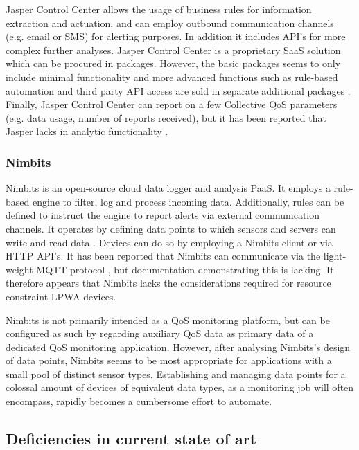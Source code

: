 Jasper Control Center allows the usage of business rules for information extraction and actuation, and can employ outbound communication channels (e.g. email or SMS) for alerting purposes.  In addition it includes API's for more complex further analyses. Jasper Control Center is a proprietary SaaS solution which can be procured in packages. However, the basic packages seems to only include minimal functionality and more advanced functions such as rule-based automation and third party API access are sold in separate additional packages \cite{cisco_jasper}. Finally, Jasper Control Center can report on a few Collective QoS parameters (e.g. data usage, number of reports received), but it has been reported that Jasper lacks in analytic functionality \cite{forrester}.

\subsubsection*{Nimbits}
Nimbits \cite{web:nimbits} is an open-source cloud data logger and analysis PaaS. It employs a rule-based engine to filter, log and process incoming data. Additionally, rules can be defined to instruct the engine to report alerts via external communication channels. It operates by defining data points to which sensors and servers can write and read data \cite{study_of_various, nimbits_mqtt}. Devices can do so by employing a Nimbits client or via HTTP API's. It has been reported that Nimbits can communicate via the light-weight MQTT protocol \cite{nimbits_mqtt}, but documentation demonstrating this is lacking. It therefore appears that Nimbits lacks the considerations required for resource constraint LPWA devices.

Nimbits is not primarily intended as a QoS monitoring platform, but can be configured as such by regarding auxiliary QoS data as primary data of a dedicated QoS monitoring application. However, after analysing Nimbits's design of data points, Nimbits seems to be most appropriate for applications with a small pool of distinct sensor types. Establishing and managing data points for a colossal amount of devices of equivalent data types, as a monitoring job will often encompass, rapidly becomes a cumbersome effort to automate.

\subsection{Deficiencies in current state of art}
